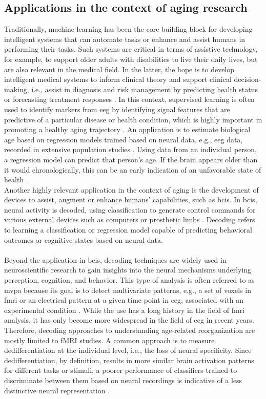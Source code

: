 \subsection{Applications in the context of aging research}
Traditionally, machine learning has been the core building block for developing intelligent systems that can automate tasks or enhance and assist humans in performing their tasks. Such systems are critical in terms of assistive technology, for example, to support older adults with disabilities to live their daily lives, but are also relevant in the medical field. In the latter, the hope is to develop intelligent medical systems to inform clinical theory and support clinical decision-making, i.e., assist in diagnosis and risk management by predicting health status or forecasting treatment responses \cite{Woo2017}. In this context, supervised learning is often used to identify markers from \gls{eeg} by identifying signal features that are predictive of a particular disease or health condition, which is highly important in promoting a healthy aging trajectory \cite{Babiloni_AlzCons2021,Mei2021}. An application is to estimate biological age based on regression models trained based on neural data, e.g., \gls{eeg} data, recorded in extensive population studies \cite{Engemann2022}. Using data from an individual person, a regression model can predict that person's age. If the brain appears older than it would chronologically, this can be an early indication of an unfavorable state of health \cite{Gonneaud2021}.\\
Another highly relevant application in the context of aging is the development of devices to assist, augment or enhance humans' capabilities, such as \glspl{bci}. In \glspl{bci}, neural activity is decoded, using classification to generate control commands for various external devices such as computers or prosthetic limbs \cite{Saha2021, Anumanchipalli2019}. Decoding refers to learning a classification or regression model capable of predicting behavioral outcomes or cognitive states based on neural data.\\
\\
Beyond the application in \glspl{bci}, decoding techniques are widely used in neuroscientific research to gain insights into the neural mechanisms underlying perception, cognition, and behavior. This type of analysis is often referred to as \gls{mvpa} because its goal is to detect multivariate patterns, e.g., a set of voxels in \gls{fmri} or an electrical pattern at a given time point in \gls{eeg}, associated with an experimental condition \cite{Holdgraf2017}. While the use has a long history in the field of \gls{fmri} analysis, it has only become more widespread in the field of \gls{eeg} in recent years. Therefore, decoding approaches to understanding age-related reorganization are mostly limited to fMRI studies. A common approach is to measure dedifferentiation at the individual level, i.e., the loss of neural specificity. Since dedifferentiation, by definition, results in more similar brain activation patterns for different tasks or stimuli, a poorer performance of classifiers trained to discriminate between them based on neural recordings is indicative of a less distinctive neural representation \cite{Koen2019, Park2010}. \\ 
